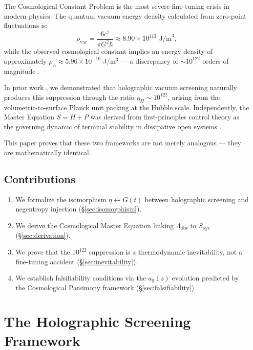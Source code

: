 \documentclass[12pt, a4paper]{article}
\theoremstyle{plain}
\theoremstyle{definition}
\theoremstyle{remark}
\begin{document}
The Cosmological Constant Problem is the most severe fine-tuning crisis in modern physics. The quantum vacuum energy density calculated from zero-point fluctuations is:
\begin{equation}
    \rho_{\text{vac}} = \frac{6c^7}{\pi G^2 \hbar} \approx 8.90 \times 10^{113} \text{ J/m}^3,
\end{equation}
while the observed cosmological constant implies an energy density of approximately $\rho_\Lambda \approx 5.96 \times 10^{-10}$ J/m$^3$ --- a discrepancy of $\sim 10^{122}$ orders of magnitude \citep{Weinberg1989}.

In prior work \citep{Haramein2023, DePaz2026ITG}, we demonstrated that holographic vacuum screening naturally produces this suppression through the ratio $\eta_H \sim 10^{122}$, arising from the volumetric-to-surface Planck unit packing at the Hubble scale. Independently, the Master Equation $S = H + P$ was derived from first-principles control theory as the governing dynamic of terminal stability in dissipative open systems \citep{DePaz2026Master}.

This paper proves that these two frameworks are not merely analogous --- they are mathematically identical.

\subsection{Contributions}
\begin{enumerate}
    \item We formalize the isomorphism $\eta \leftrightarrow G(t)$ between holographic screening and negentropy injection (\S\ref{sec:isomorphism}).
    \item We derive the Cosmological Master Equation linking $\Lambda_{\text{obs}}$ to $S_{sys}$ (\S\ref{sec:derivation}).
    \item We prove that the $10^{122}$ suppression is a thermodynamic inevitability, not a fine-tuning accident (\S\ref{sec:inevitability}).
    \item We establish falsifiability conditions via the $a_0(z)$ evolution predicted by the Cosmological Parsimony framework (\S\ref{sec:falsifiability}).
\end{enumerate}

\section{The Holographic Screening Framework}\label{sec:screening}
\end{document}
